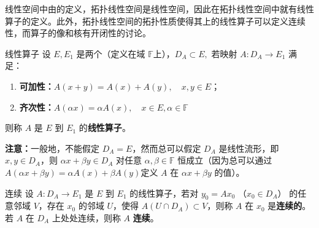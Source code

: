 
线性空间中由的定义，拓扑线性空间是线性空间，因此在拓扑线性空间中就有线性算子的定义。此外，拓扑线性空间的拓扑性质使得其上的线性算子可以定义连续性，而算子的像和核有开闭性的讨论。

\begin{definition}{线性算子}
设 $E,E_1$ 是两个（定义在域 $\mathbb F$上），$D_A\subset E,$ 若映射 $A:D_A\rightarrow E_1$ 满足：
\begin{enumerate}
\item \textbf{可加性：}$A(x+y)=A(x)+A(y),\quad x,y\in E$；
\item \textbf{齐次性：}$A(\alpha x)=\alpha A(x),\quad x\in E,\alpha\in \mathbb F$
\end{enumerate}
则称 $A$ 是 $E$ 到 $E_1$ 的\textbf{线性算子}。
  
\end{definition}

\textbf{注意：}一般地，不能假定 $D_A=E$，然而总可以假定 $D_A$ 是线性流形，即 $x,y\in D_A$，则 $\alpha x+\beta y\in D_A$ 对任意 $\alpha,\beta\in\mathbb F$ 恒成立（因为总可以通过 $A(\alpha x+\beta y)=\alpha A(x)+\beta A(y)$定义 $A$ 在 $\alpha x+\beta y$ 的值）。

\begin{definition}{连续}
设 $A:D_A\rightarrow E_1$ 是 $E$ 到 $E_1$ 的线性算子，若对 $y_0=Ax_0$ （$x_0\in D_A$） 的任意邻域 $V$，存在 $x_0$ 的邻域 $U$，使得 $A(U\cap D_A)\subset V$，则称 $A$ 在 $x_0$ 是\textbf{连续的}。若 $A$ 在 $D_A$ 上处处连续，则称 $A$ \textbf{连续}。
\end{definition}
